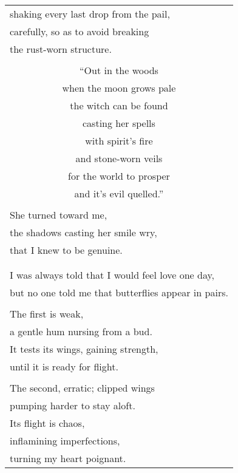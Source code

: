 \documentclass{article}
\begin{document}
\begin{center}
\begin{tabular}{l}
shaking every last drop from the pail, \\
carefully, so as to avoid breaking \\
the rust-worn structure. \\
\\
\multicolumn{1}{c}{``Out in the woods} \\
\multicolumn{1}{c}{when the moon grows pale} \\
\multicolumn{1}{c}{the witch can be found} \\
\multicolumn{1}{c}{casting her spells} \\
\multicolumn{1}{c}{with spirit's fire} \\
\multicolumn{1}{c}{and stone-worn veils} \\
\multicolumn{1}{c}{for the world to prosper} \\
\multicolumn{1}{c}{and it's evil quelled.''} \\
\\
She turned toward me, \\
the shadows casting her smile wry, \\
that I knew to be genuine. \\
\\
\\ %
I was always told that I would feel love one day, \\
but no one told me that butterflies appear in pairs. \\
\\
The first is weak, \\
a gentle hum nursing from a bud. \\
It tests its wings, gaining strength, \\
until it is ready for flight. \\
\\
The second, erratic; clipped wings \\
pumping harder to stay aloft. \\
Its flight is chaos, \\
inflamining imperfections, \\
turning my heart poignant. \\

\end{tabular}
\end{center}
\end{document}
